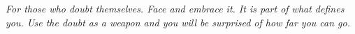 \documentclass[pretext-section.tex]{subfiles}
\begin{document}
\begin{dedicatoria}
    \vspace*{\fill}
    \centering
    \noindent
    \textit{For those who doubt themselves. Face and embrace it. It is 
    part of what defines you. Use the doubt as a weapon and you will be surprised 
    of how far you can go.} 
    \vspace*{\fill}
 \end{dedicatoria}
\end{document}
